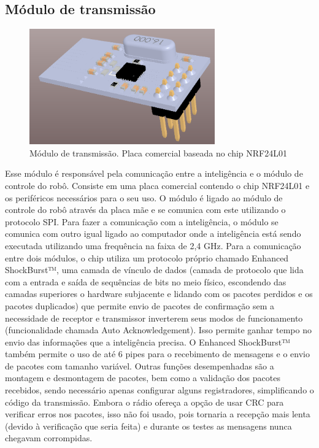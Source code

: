 \documentclass[letterpaper, 10 pt, conference]{ieeeconf}  %
\begin{document}
\subsection{Módulo de transmissão}

\begin{figure}[thpb]	
	\centering
	\includegraphics[width=8cm]{img/modulotransmissao}
	\caption{Módulo de transmissão. Placa comercial baseada no chip NRF24L01}
	\label{img:modulotransmissao}
\end{figure}

	Esse módulo é responsável pela comunicação entre a inteligência e o módulo de controle do robô. Consiste em uma placa comercial contendo o chip NRF24L01 e os periféricos necessários para o seu uso.
O módulo é ligado ao módulo de controle do robô através da placa mãe e se comunica com este utilizando o protocolo SPI. Para fazer a comunicação com a inteligência, o módulo se comunica com outro igual ligado ao computador onde a inteligência está sendo executada utilizando uma frequência na faixa de 2,4 GHz.
Para a comunicação entre dois módulos, o chip utiliza um protocolo próprio chamado Enhanced ShockBurst™, uma camada de vínculo de dados (camada de protocolo que lida com a entrada e saída de sequências de bits no meio físico, escondendo das camadas superiores o hardware subjacente e lidando com os pacotes perdidos e os pacotes duplicados) que permite envio de pacotes de confirmação sem a necessidade de receptor e transmissor inverterem seus modos de funcionamento (funcionalidade chamada Auto Acknowledgement). Isso permite ganhar tempo no envio das informações que a inteligência precisa. 
O Enhanced ShockBurst™ também permite o uso de até 6 pipes para o recebimento de mensagens e o envio de pacotes com tamanho variável. Outras funções desempenhadas são a montagem e desmontagem de pacotes, bem como a validação dos pacotes recebidos, sendo necessário apenas configurar alguns registradores, simplificando o código da transmissão.
Embora o rádio ofereça a opção de usar CRC para verificar erros nos pacotes, isso não foi usado, pois tornaria a recepção mais lenta (devido à verificação que seria feita) e durante os testes as mensagens nunca chegavam corrompidas.
\end{document}
